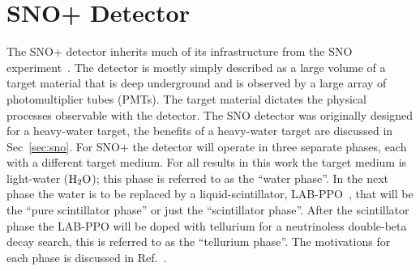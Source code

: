 
\chapter{SNO+ Detector}
\label{sec:detector}

\ifpdf
    \graphicspath{{detector/figures/PNG/}{detector/figures/PDF/}{detector/figures/}}
\else
    \graphicspath{{detector/figures/EPS/}{detector/figures/}}
\fi


The SNO+ detector inherits much of its infrastructure from the SNO
experiment~\citep{sno_detector_paper}.
The detector is mostly simply described as a large volume of a
target material that is deep underground and is observed by a large array of
photomultiplier tubes (PMTs).
The target material dictates the physical processes
observable with the detector.
The SNO detector was originally designed for a heavy-water
target, the benefits of a heavy-water target are discussed in Sec~\ref{sec:sno}.
For SNO+ the detector will operate in three separate phases, each with a different
target medium.
For all results in this work the target medium is light-water ($\ce{H_{2}O}$);
this phase is referred to as the ``water phase''.
In the next phase the water is to be replaced by a liquid-scintillator,
LAB-PPO~\citep{mchen_labppo}, that will be the ``pure scintillator phase'' or
just the ``scintillator phase''.
After the scintillator phase the LAB-PPO will be doped with tellurium for
a neutrinoless double-beta decay search, this is referred to as the ``tellurium phase''.
The motivations for each phase is discussed in Ref.~\citep{snop_status_prospects}.

